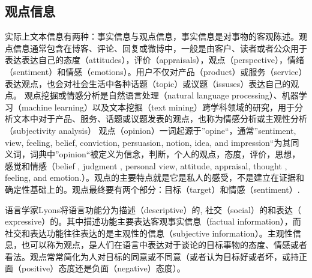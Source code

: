 \subsection{观点信息}
实际上文本信息有两种：事实信息与观点信息，事实信息是对事物的客观陈述。观点信息通常包含在博客、评论、回复或微博中，一般是由客户、读者或者公众用于表达表达自己的态度（attitudes），评价（appraisals），观点（perspective），情绪（sentiment）和情感（emotions）。用户不仅对产品（product）或服务（service）表达观点，也会对社会生活中各种话题（topic）或议题（issuses）表达自己的观点。
观点挖掘或情感分析是自然语言处理（natural language processing）、机器学习（machine learning）以及文本挖掘（text mining）跨学科领域的研究，用于分析文本中对于产品、服务、话题或议题发表的观点，也称为情感分析或主观性分析（subjectivity analysis）
观点（opinion）一词起源于”opine“，通常”sentiment, view, feeling, belief, conviction, persuasion, notion, idea, and impression“为其同义词，词典中”opinion“被定义为信念，判断，个人的观点，态度，评价，思想，感觉和情感（belief , judgment , personal view, attitude, appraisal, thought , feeling, and emotion.）。观点的主要特点就是它是私人的感受，不是建立在证据和确定性基础上的。观点最终要有两个部分：目标（target）和情感（sentiment）.



语言学家Lyons将语言功能分为描述（descriptive）的, 社交（social）的和表达（ expressive）的。其中描述功能主要表达客观事实信息（factual information），而社交和表达功能往往表达的是主观性的信息（subjective information）。主观性信息，也可以称为观点，是人们在语言中表达对于谈论的目标事物的态度、情感或者看法。观点常常简化为人对目标的同意或不同意（或者认为目标好或者坏，或持正面（positive）态度还是负面（negative）态度）。

